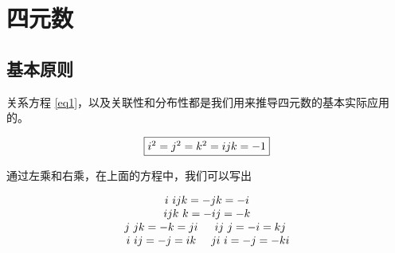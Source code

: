 %
%



%

%


%


%

%



\section{四元数}
\label{quat}

\subsection{基本原则}

关系方程 \eqref{eq1}，以及关联性和分布性都是我们用来推导四元数的基本实际应用的。

\begin{equation}
\fbox{$i^2 = j^2 = k^2 = ijk = -1$}
\label{eq1}
\end{equation}

通过左乘和右乘，在上面的方程中，我们可以写出 


\begin{equation*}
\begin{tabular}{cc}
	\multicolumn{2}{c}{$i\ ijk = -jk = -i$}  \\
	\multicolumn{2}{c}{$ijk\ k = -ij = -k$}  \\
	$j \ jk = -k = ji$  &   $ij \ j = -i = kj$  \\
	$i \ ij = -j = ik$  &   $ji \ i = -j = -ki$ 
\end{tabular}
\end{equation*}

